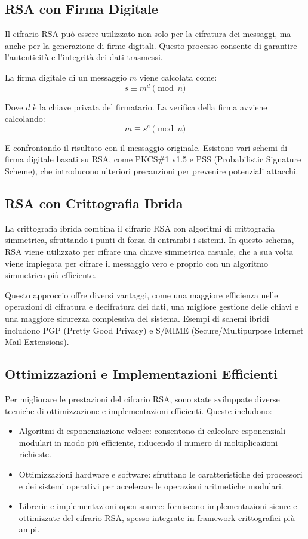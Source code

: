 \documentclass[a4paper,12pt]{report}
\begin{document}
\subsection{RSA con Firma Digitale}
Il cifrario RSA può essere utilizzato non solo per la cifratura dei messaggi, ma anche per la generazione di firme digitali. Questo processo consente di garantire l'autenticità e l'integrità dei dati trasmessi.

La firma digitale di un messaggio $m$ viene calcolata come:
\[s \equiv m^d \pmod{n}\]

Dove $d$ è la chiave privata del firmatario. La verifica della firma avviene calcolando:
\[m \equiv s^e \pmod{n}\]

E confrontando il risultato con il messaggio originale. Esistono vari schemi di firma digitale basati su RSA, come PKCS\#1 v1.5 e PSS (Probabilistic Signature Scheme), che introducono ulteriori precauzioni per prevenire potenziali attacchi.

\subsection{RSA con Crittografia Ibrida}
La crittografia ibrida combina il cifrario RSA con algoritmi di crittografia simmetrica, sfruttando i punti di forza di entrambi i sistemi. In questo schema, RSA viene utilizzato per cifrare una chiave simmetrica casuale, che a sua volta viene impiegata per cifrare il messaggio vero e proprio con un algoritmo simmetrico più efficiente.

Questo approccio offre diversi vantaggi, come una maggiore efficienza nelle operazioni di cifratura e decifratura dei dati, una migliore gestione delle chiavi e una maggiore sicurezza complessiva del sistema. 
Esempi di schemi ibridi includono PGP (Pretty Good Privacy) e S/MIME (Secure/Multipurpose Internet Mail Extensions).

\subsection{Ottimizzazioni e Implementazioni Efficienti}
Per migliorare le prestazioni del cifrario RSA, sono state sviluppate diverse tecniche di ottimizzazione e implementazioni efficienti. Queste includono:

\begin{itemize}
   \item Algoritmi di esponenziazione veloce: consentono di calcolare esponenziali modulari in modo più efficiente, riducendo il numero di moltiplicazioni richieste.
   \item Ottimizzazioni hardware e software: sfruttano le caratteristiche dei processori e dei sistemi operativi per accelerare le operazioni aritmetiche modulari.
   \item Librerie e implementazioni open source: forniscono implementazioni sicure e ottimizzate del cifrario RSA, spesso integrate in framework crittografici più ampi.
\end{itemize}
\end{document}
